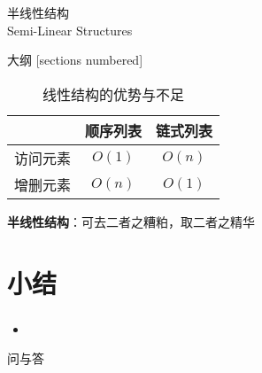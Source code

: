 \begin{standout}[第二章]
    半线性结构\\
    Semi-Linear Structures
\end{standout}

\begin{frame}{大纲}
    [sections numbered]
    \tableofcontents
\end{frame}

\begin{frame}
    \begin{table}
        \small
        \label{tab:linear_structures_disadvantages}
        \caption{线性结构的优势与不足}
        \begin{tabular}{rcc}
            \toprule
            & \textbf{顺序列表} & \textbf{链式列表} \\
            \midrule
            访问元素 & $O(1)$ & $O(n)$ \\
            增删元素 & $O(n)$ & $O(1)$ \\
            \bottomrule
        \end{tabular}
    \end{table}
    \pause
    \centering
    \textbf{半线性结构}：可去二者之糟粕，取二者之精华
\end{frame}

% 


\section{小结}

\begin{frame}
    \frametitle{\insertsectionhead}
    \begin{itemize}
        \item 
    \end{itemize}
\end{frame}

\begin{standout}[]
    问与答
\end{standout}